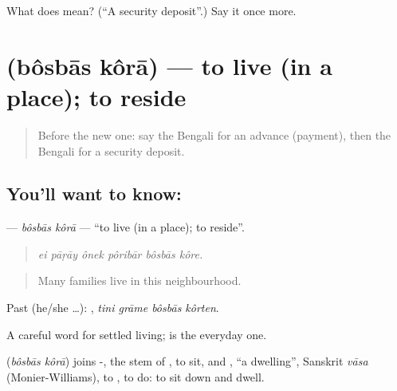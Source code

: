 \begin{tcolorbox}[breakable,colback=teal!4,colframe=teal!35!black,title={Before you move on}]
What does  mean? (\textquotedblleft{}A security deposit\textquotedblright{}.) Say it once more.
\end{tcolorbox}
\section[\texorpdfstring{\bn{বসবাস} \bn{করা} (bôsbās kôrā)}{বসবাস করা (bôsbās kôrā)}]{  (bôsbās kôrā) — to live (in a place); to reside}

\label{lesson:BN-C408-bosbas-kora}



\begin{quote}
Before the new one: say the Bengali for an advance (payment), then the Bengali for a security deposit.
\end{quote}

\subsection*{You'll want to know:  }
\textbf{ } — \emph{bôsbās kôrā} — \textquotedblleft{}to live (in a place); to reside\textquotedblright{}.

\begin{quote}
     
\end{quote}

\begin{quote}
\emph{ei pāṛāy ônek pôribār bôsbās kôre.}
\end{quote}

\begin{quote}
Many families live in this neighbourhood.
\end{quote}

Past (he/she …):    , \emph{tini grāme bôsbās kôrten}.

A careful word for settled living;  is the everyday one.

\begin{cousinweb}
\textbf{ } (\emph{bôsbās kôrā}) joins -, the stem of , to sit, and , \textquotedblleft{}a dwelling\textquotedblright{}, Sanskrit \emph{vāsa} (Monier-Williams), to , to do: to sit down and dwell.
\end{cousinweb}


